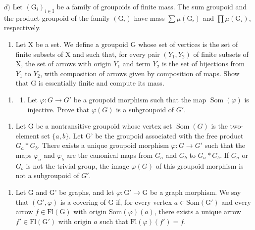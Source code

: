 \(d)\) Let \((\mathrm{G}_i)_{i\in \mathrm{I}}\) be a family of groupoids of finite mass. The sum groupoid and the product groupoid of the family \((\mathrm{G}_i)\) have mass \(\sum \mu (\mathrm{G}_i)\) and \(\prod \mu (\mathrm{G}_i)\), respectively.

\begin{enumerate}
\def\labelenumi{\alph{enumi})}
\setcounter{enumi}{4}
\tightlist
\item
  Let X be a set. We define a groupoid G whose set of vertices is the set of finite subsets of X and such that, for every pair \((Y_{1}, Y_{2})\) of finite subsets of X, the set of arrows with origin \(Y_{1}\) and term \(Y_{2}\) is the set of bijections from \(Y_{1}\) to \(Y_{2}\), with composition of arrows given by composition of maps. Show that G is essentially finite and compute its mass.
\end{enumerate}

\begin{enumerate}
\def\labelenumi{\arabic{enumi})}
\setcounter{enumi}{4}
\tightlist
\item
  \begin{enumerate}
  \def\labelenumii{\alph{enumii})}
  \tightlist
  \item
    Let \(\varphi\colon G\to G'\) be a groupoid morphism such that the map \(\operatorname{Som}(\varphi)\) is injective. Prove that \(\varphi(G)\) is a subgroupoid of \(G'\).
  \end{enumerate}
\end{enumerate}

\begin{enumerate}
\def\labelenumi{\alph{enumi})}
\setcounter{enumi}{1}
\tightlist
\item
  Let G be a nontransitive groupoid whose vertex set \(\operatorname{Som}(G)\) is the two-element set \(\{a,b\}\). Let G' be the groupoid associated with the free product \(G_a*G_b\). There exists a unique groupoid morphism \(\varphi:G\to G'\) such that the maps \(\varphi_a\) and \(\varphi_b\) are the canonical maps from \(G_a\) and \(G_b\) to \(G_a*G_b\). If \(G_a\) or \(G_b\) is not the trivial group, the image \(\varphi(G)\) of this groupoid morphism is not a subgroupoid of \(G'\).
\end{enumerate}

\begin{enumerate}
\def\labelenumi{\arabic{enumi})}
\setcounter{enumi}{5}
\tightlist
\item
  Let G and G' be graphs, and let \(\varphi\colon\mathrm{G}'\to\mathrm{G}\) be a graph morphism. We say that \((\mathrm{G}',\varphi)\) is a covering of G if, for every vertex \(a\in\mathrm{Som}(\mathrm{G}')\) and every arrow \(f\in\mathrm{Fl}(\mathrm{G})\) with origin \(\mathrm{Som}(\varphi)(a)\), there exists a unique arrow \(f'\in\mathrm{Fl}(\mathrm{G}')\) with origin \(a\) such that \(\mathrm{Fl}(\varphi)(f')=f\).
\end{enumerate}

